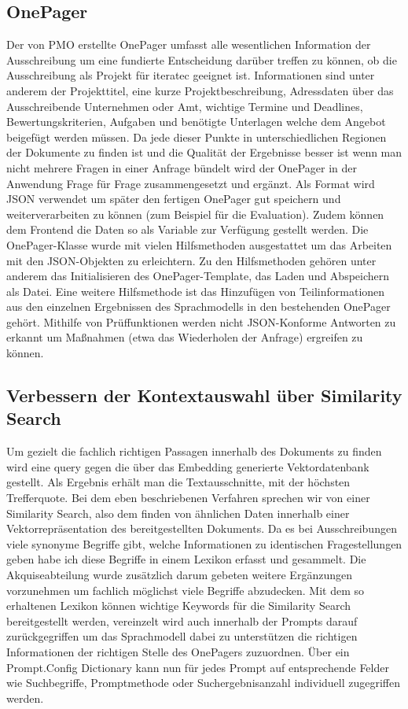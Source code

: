 \subsection{OnePager}
Der von PMO erstellte OnePager umfasst alle wesentlichen Information der Ausschreibung um eine fundierte Entscheidung
darüber treffen zu können, ob die Ausschreibung als Projekt für iteratec geeignet ist. Informationen sind unter anderem
der Projekttitel, eine kurze Projektbeschreibung, Adressdaten über das Ausschreibende Unternehmen oder Amt, wichtige
Termine und Deadlines, Bewertungskriterien, Aufgaben und benötigte Unterlagen welche dem Angebot beigefügt werden
müssen. Da jede dieser Punkte in unterschiedlichen Regionen der Dokumente zu finden ist und die Qualität der Ergebnisse
besser ist wenn man nicht mehrere Fragen in einer Anfrage bündelt wird der OnePager in der Anwendung Frage für Frage
zusammengesetzt und ergänzt. Als Format wird JSON verwendet um später den fertigen OnePager gut speichern und
weiterverarbeiten zu können (zum Beispiel für die Evaluation). Zudem können dem Frontend die Daten so als Variable zur
Verfügung gestellt werden. Die OnePager-Klasse wurde mit vielen Hilfsmethoden ausgestattet um das Arbeiten mit den
JSON-Objekten zu erleichtern. Zu den Hilfsmethoden gehören unter anderem das Initialisieren des OnePager-Template, das
Laden und Abspeichern als Datei. Eine weitere Hilfsmethode ist das Hinzufügen von Teilinformationen aus den einzelnen
Ergebnissen des Sprachmodells in den bestehenden OnePager gehört. Mithilfe von Prüffunktionen werden nicht JSON-Konforme
Antworten zu erkannt um Maßnahmen (etwa das Wiederholen der Anfrage) ergreifen zu können.

\subsection{Verbessern der Kontextauswahl über Similarity Search}
\label{chap:Verbessern der Kontextauswahl über Similarity Search}
Um gezielt die fachlich richtigen Passagen innerhalb des Dokuments zu finden wird eine query gegen die über das
Embedding generierte Vektordatenbank gestellt. Als Ergebnis erhält man die Textausschnitte, mit der höchsten
Trefferquote. Bei dem eben beschriebenen Verfahren sprechen wir von einer Similarity Search, also dem finden von
ähnlichen Daten innerhalb einer Vektorrepräsentation des bereitgestellten Dokuments. Da es bei Ausschreibungen viele
synonyme Begriffe gibt, welche Informationen zu identischen Fragestellungen geben habe ich diese Begriffe in einem
Lexikon erfasst und gesammelt. Die Akquiseabteilung wurde zusätzlich darum gebeten weitere Ergänzungen vorzunehmen um
fachlich möglichst viele Begriffe abzudecken. Mit dem so erhaltenen Lexikon können wichtige Keywords für die Similarity
Search bereitgestellt werden, vereinzelt wird auch innerhalb der Prompts darauf zurückgegriffen um das Sprachmodell
dabei zu unterstützen die richtigen Informationen der richtigen Stelle des OnePagers zuzuordnen. Über ein Prompt.Config
Dictionary kann nun für jedes Prompt auf entsprechende Felder wie Suchbegriffe, Promptmethode oder Suchergebnisanzahl
individuell zugegriffen werden.

